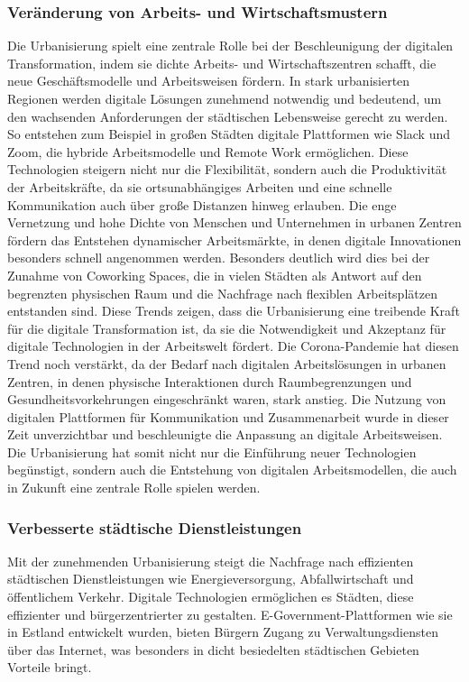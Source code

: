 \documentclass[conference,compsoc,final,a4paper, onecolumn, 11pt]{IEEEtran}
\begin{document}
\subsubsection{Veränderung von Arbeits- und Wirtschaftsmustern}
Die Urbanisierung spielt eine zentrale Rolle bei der Beschleunigung der digitalen Transformation, indem sie dichte Arbeits- und Wirtschaftszentren schafft, die neue Geschäftsmodelle und Arbeitsweisen fördern. 
In stark urbanisierten Regionen werden digitale Lösungen zunehmend notwendig und bedeutend, um den wachsenden Anforderungen der städtischen Lebensweise gerecht zu werden. 
So entstehen zum Beispiel in großen Städten digitale Plattformen wie Slack und Zoom, die hybride Arbeitsmodelle und Remote Work ermöglichen. 
Diese Technologien steigern nicht nur die Flexibilität, sondern auch die Produktivität der Arbeitskräfte, da sie ortsunabhängiges Arbeiten und eine schnelle Kommunikation auch über große Distanzen hinweg erlauben.
Die enge Vernetzung und hohe Dichte von Menschen und Unternehmen in urbanen Zentren fördern das Entstehen dynamischer Arbeitsmärkte, in denen digitale Innovationen besonders schnell angenommen werden. 
Besonders deutlich wird dies bei der Zunahme von Coworking Spaces, die in vielen Städten als Antwort auf den begrenzten physischen Raum und die Nachfrage nach flexiblen Arbeitsplätzen entstanden sind. 
Diese Trends zeigen, dass die Urbanisierung eine treibende Kraft für die digitale Transformation ist, da sie die Notwendigkeit und Akzeptanz für digitale Technologien in der Arbeitswelt fördert.
Die Corona-Pandemie hat diesen Trend noch verstärkt, da der Bedarf nach digitalen Arbeitslösungen in urbanen Zentren, in denen physische Interaktionen durch Raumbegrenzungen und Gesundheitsvorkehrungen eingeschränkt waren, stark anstieg. 
Die Nutzung von digitalen Plattformen für Kommunikation und Zusammenarbeit wurde in dieser Zeit unverzichtbar und beschleunigte die Anpassung an digitale Arbeitsweisen. 
Die Urbanisierung hat somit nicht nur die Einführung neuer Technologien begünstigt, sondern auch die Entstehung von digitalen Arbeitsmodellen, die auch in Zukunft eine zentrale Rolle spielen werden.\autocite{global_sustainability_gap}


\subsubsection{ Verbesserte städtische Dienstleistungen}
Mit der zunehmenden Urbanisierung steigt die Nachfrage nach effizienten städtischen Dienstleistungen wie Energieversorgung, Abfallwirtschaft und öffentlichem Verkehr. 
Digitale Technologien ermöglichen es Städten, diese effizienter und bürgerzentrierter zu gestalten. 
E-Government-Plattformen wie sie in Estland entwickelt wurden, bieten Bürgern Zugang zu Verwaltungsdiensten über das Internet, was besonders in dicht besiedelten städtischen Gebieten Vorteile bringt.\autocite{un_habitat_world_cities}
\end{document}
